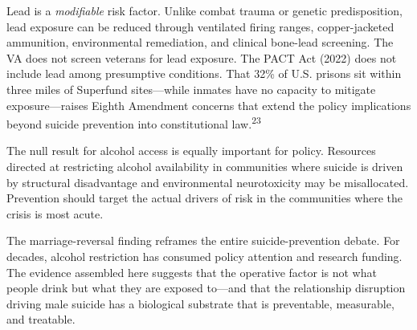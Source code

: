 \documentclass[11pt,twocolumn]{article}
\begin{document}
Lead is a \textit{modifiable} risk factor. Unlike combat trauma or genetic predisposition, lead exposure can be reduced through ventilated firing ranges, copper-jacketed ammunition, environmental remediation, and clinical bone-lead screening. The VA does not screen veterans for lead exposure. The PACT Act (2022) does not include lead among presumptive conditions. That 32\% of U.S. prisons sit within three miles of Superfund sites---while inmates have no capacity to mitigate exposure---raises Eighth Amendment concerns that extend the policy implications beyond suicide prevention into constitutional law.\textsuperscript{23}

The null result for alcohol access is equally important for policy. Resources directed at restricting alcohol availability in communities where suicide is driven by structural disadvantage and environmental neurotoxicity may be misallocated. Prevention should target the actual drivers of risk in the communities where the crisis is most acute.

The marriage-reversal finding reframes the entire suicide-prevention debate. For decades, alcohol restriction has consumed policy attention and research funding. The evidence assembled here suggests that the operative factor is not what people drink but what they are exposed to---and that the relationship disruption driving male suicide has a biological substrate that is preventable, measurable, and treatable.


\end{document}
